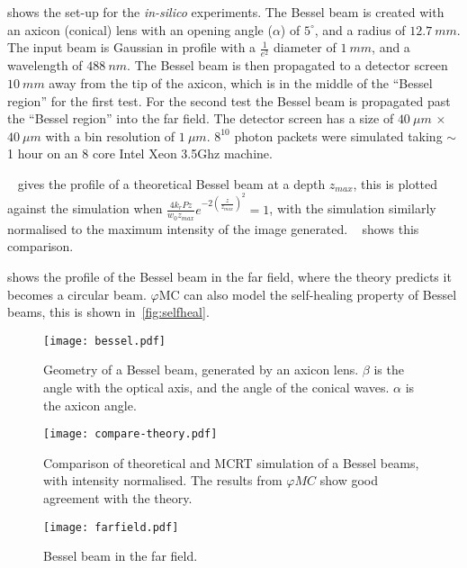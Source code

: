  shows the set-up for the \textit{in-silico} experiments.
The Bessel beam is created with an axicon (conical) lens with an opening angle ($\alpha$) of $5^{\circ}$, and a radius of $12.7~mm$.
The input beam is Gaussian in profile with a $\tfrac{1}{e^2}$ diameter of $1~mm$, and a wavelength of $488~nm$.
The Bessel beam is then propagated to a detector screen $10~mm$ away from the tip of the axicon, which is in the middle of the ``Bessel region'' for the first test.
For the second test the Bessel beam is propagated past the ``Bessel region'' into the far field.
The detector screen has a size of $40~\mu m$ $\times$ $40~\mu m$ with a bin resolution of $1~\mu m$.
$8^{10}$ photon packets were simulated taking $\sim$ 1 hour on an 8 core Intel Xeon 3.5Ghz machine.

\medskip

~ gives the profile of a theoretical Bessel beam at a depth $z_{max}$, this is plotted against the simulation when $\tfrac{4k_rPz}{w_0z_{max}}e^{-2\left(\tfrac{z}{z_{max}}\right)^2}=1$, with the simulation similarly normalised to the maximum intensity of the image generated. ~ shows this comparison.

 shows the profile of the Bessel beam in the far field, where the theory predicts it becomes a circular beam.
$\varphi$MC can also model the self-healing property of Bessel beams, this is shown in~\cref{fig:selfheal}.

\begin{figure}[!htbp]
    \centering
    \texttt{[image: bessel.pdf]}
    \caption{Geometry of a Bessel beam, generated by an axicon lens. $\beta$ is the angle with the optical axis, and the angle of the conical waves. $\alpha$ is the axicon angle.}
    \label{fig:besselgeo}
\end{figure}


\begin{figure}[!htbp]
    \centering
    \texttt{[image: compare-theory.pdf]}
    \caption{Comparison of theoretical and MCRT simulation of a Bessel beams, with intensity normalised. The results from $\varphi MC$ show good agreement with the theory.}
    \label{fig:besselCompare}
\end{figure}

\begin{figure}[!htbp]
\centering
\texttt{[image: farfield.pdf]}
\caption{Bessel beam in the far field.}
\label{fig:farfield}
\end{figure}

